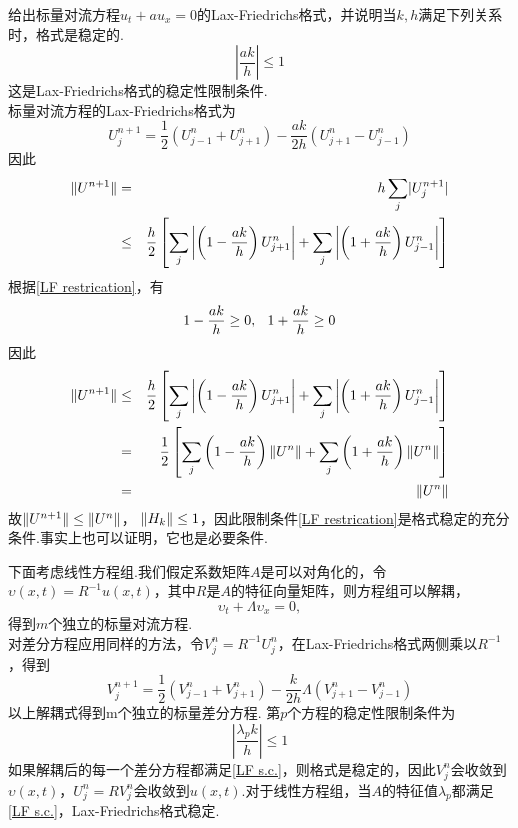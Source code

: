 \begin{myexample}
	给出标量对流方程$u_t + au_x =0$的Lax-Friedrichs格式，并说明当$k,h$满足下列关系时，格式是稳定的.
	\begin{equation} \label{LF restrication}
		\left|\frac{ak}{h} \right|  \le 1
	\end{equation}
	这是Lax-Friedrichs格式的稳定性限制条件.\\
	标量对流方程的Lax-Friedrichs格式为
	\begin{equation}
		U_j^{n+1}=\frac{1}{2}(U_{j-1}^n+U_{j+1}^n) - \frac{ak}{2h}(U_{j+1}^n-U_{j-1}^n)
	\end{equation}
	因此
	\begin{eqnarray*}
		\lVert U^{n+1}\rVert &=& h\sum_j \lvert U_j^{n+1}\rvert \\
		&\le& \frac{h}{2} \left[ \sum_j \left|  \left( 1-\frac{ak}{h}\right)U_{j+1}^{n} \right| + \sum_j \left|  \left( 1+\frac{ak}{h}\right)U_{j-1}^{n} \right|\right]
	\end{eqnarray*}
根据\eqref{LF restrication}，有
	\begin{equation}
		1-\frac{ak}{h} \ge 0, \hspace{0.1in} 1+\frac{ak}{h} \ge 0
	\end{equation}
	因此
 	\begin{eqnarray*}
		\lVert U^{n+1}\rVert &\le& \frac{h}{2} \left[ \sum_j \left|  \left( 1-\frac{ak}{h}\right)U_{j+1}^{n} \right| + \sum_j \left|  \left( 1+\frac{ak}{h}\right)U_{j-1}^{n} \right|\right] \\
		&=&  
		\frac{1}{2} \left[ \sum_j   \left( 1-\frac{ak}{h}\right)\lVert U^n\rVert  + \sum_j \left( 1+\frac{ak}{h}\right)\lVert U^{n}\rVert \right] \\
		&=& \lVert U^n\rVert
	\end{eqnarray*}
	故$\lVert U^{n+1}\rVert \le \lVert U^n\rVert$， $\lVert H_k\rVert \le 1$，因此限制条件\eqref{LF restrication}是格式稳定的充分条件.事实上也可以证明，它也是必要条件.
\end{myexample}
下面考虑线性方程组.我们假定系数矩阵$A$是可以对角化的，令$\upsilon(x,t) = R^{-1}u(x,t)$，其中$R$是$A$的特征向量矩阵，则方程组可以解耦，
\begin{equation}
	\upsilon_t + \Lambda \upsilon_x = 0,
\end{equation}
得到$m$个独立的标量对流方程.\\
对差分方程应用同样的方法，令$V_j^n = R^{-1}U_j^n$，在Lax-Friedrichs格式两侧乘以$R^{-1}$，得到
\begin{equation}
	V_j^{n+1}=\frac{1}{2}(V_{j-1}^n+V_{j+1}^n) - \frac{k}{2h}\Lambda(V_{j+1}^n-V_{j-1}^n)
\end{equation}
以上解耦式得到m个独立的标量差分方程. 第$p$个方程的稳定性限制条件为
	\begin{equation} \label{LF s.c.}
\left|\frac{\lambda_p k}{h} \right|  \le 1
\end{equation}
如果解耦后的每一个差分方程都满足\eqref{LF s.c.}，则格式是稳定的，因此$V_j^n$会收敛到$\upsilon(x,t)$，$U_j^n=RV_j^n$会收敛到$u(x,t)$.对于线性方程组，当$A$的特征值$\lambda_p$都满足\eqref{LF s.c.}，Lax-Friedrichs格式稳定.

